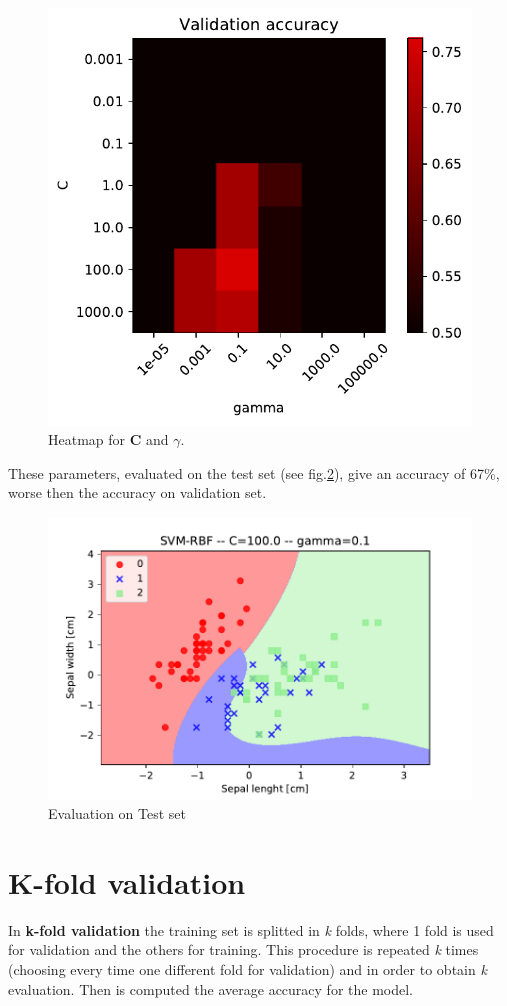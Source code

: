 \documentclass[10pt,a4paper]{article}
\begin{document}
\begin{figure}
\centering
\includegraphics[width=0.7\linewidth]{../Images/validation_accuracy}
\caption{Heatmap for \textbf{C} and $\gamma$.}
\label{fig:validation_accuracy}
\end{figure}

These parameters, evaluated on the test set (see fig.\ref{fig:rbf_C100G01_best}), give an accuracy of 67\%, worse then the accuracy on validation set.

\begin{figure}[!]
\centering
\includegraphics[width=0.7\linewidth]{../Images/rbf_C100G01_best}
\caption{Evaluation on Test set}
\label{fig:rbf_C100G01_best}
\end{figure}

\section{K-fold validation}

In \textbf{k-fold validation} the training set is splitted in \emph{k} folds, where 1 fold is used for validation and the others for training. This procedure is repeated \emph{k} times (choosing every time one different fold for validation) and in order to obtain \emph{k} evaluation. Then is computed the average accuracy for the model. 
\end{document}
